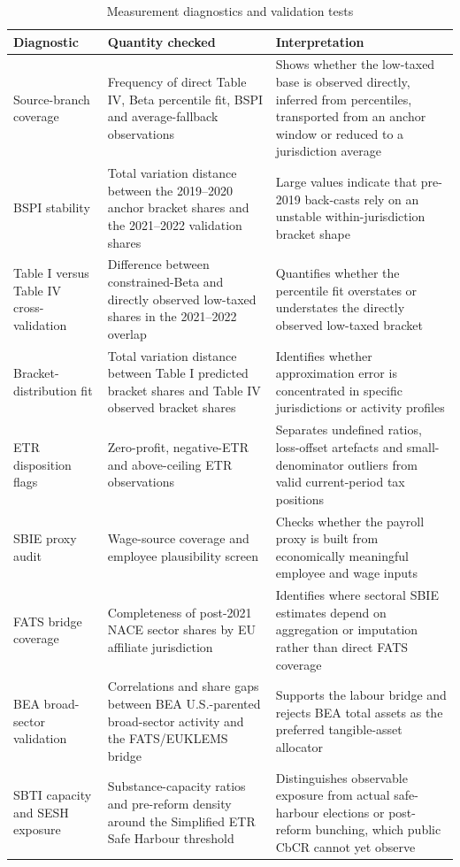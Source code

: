 \documentclass[11pt,a4paper]{article}
\begin{document}
\begin{table}[H]
\centering
\caption{Measurement diagnostics and validation tests}
\label{tab:measurement_diagnostics}
\footnotesize
\begin{tabularx}{\textwidth}{@{}L{3.0cm}L{4.1cm}X@{}}
\toprule
Diagnostic & Quantity checked & Interpretation \\
\midrule
Source-branch coverage & Frequency of direct Table IV, Beta percentile fit, BSPI and average-fallback observations & Shows whether the low-taxed base is observed directly, inferred from percentiles, transported from an anchor window or reduced to a jurisdiction average \\
BSPI stability & Total variation distance between the 2019--2020 anchor bracket shares and the 2021--2022 validation shares & Large values indicate that pre-2019 back-casts rely on an unstable within-jurisdiction bracket shape \\
Table I versus Table IV cross-validation & Difference between constrained-Beta and directly observed low-taxed shares in the 2021--2022 overlap & Quantifies whether the percentile fit overstates or understates the directly observed low-taxed bracket \\
Bracket-distribution fit & Total variation distance between Table I predicted bracket shares and Table IV observed bracket shares & Identifies whether approximation error is concentrated in specific jurisdictions or activity profiles \\
ETR disposition flags & Zero-profit, negative-ETR and above-ceiling ETR observations & Separates undefined ratios, loss-offset artefacts and small-denominator outliers from valid current-period tax positions \\
SBIE proxy audit & Wage-source coverage and employee plausibility screen & Checks whether the payroll proxy is built from economically meaningful employee and wage inputs \\
FATS bridge coverage & Completeness of post-2021 NACE sector shares by EU affiliate jurisdiction & Identifies where sectoral SBIE estimates depend on aggregation or imputation rather than direct FATS coverage \\
BEA broad-sector validation & Correlations and share gaps between BEA U.S.-parented broad-sector activity and the FATS/EUKLEMS bridge & Supports the labour bridge and rejects BEA total assets as the preferred tangible-asset allocator \\
SBTI capacity and SESH exposure & Substance-capacity ratios and pre-reform density around the Simplified ETR Safe Harbour threshold & Distinguishes observable exposure from actual safe-harbour elections or post-reform bunching, which public CbCR cannot yet observe \\
\bottomrule
\end{tabularx}
\end{table}
\end{document}
